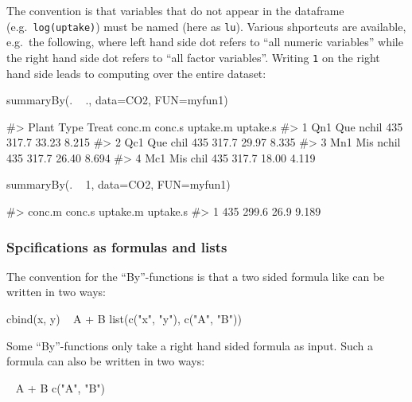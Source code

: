 The convention is that variables that do not appear in the dataframe
(e.g.~\texttt{log(uptake)}) must be named (here as \texttt{lu}). Various
shportcuts are available, e.g.~the following, where left hand side dot
refers to ``all numeric variables'' while the right hand side dot refers
to ``all factor variables''. Writing \texttt{1} on the right hand side
leads to computing over the entire dataset:

\begin{Schunk}
\begin{Sinput}
summaryBy(. ~ ., data=CO2, FUN=myfun1)
\end{Sinput}
\begin{Soutput}
#>   Plant Type Treat conc.m conc.s uptake.m uptake.s
#> 1   Qn1  Que nchil    435  317.7    33.23    8.215
#> 2   Qc1  Que  chil    435  317.7    29.97    8.335
#> 3   Mn1  Mis nchil    435  317.7    26.40    8.694
#> 4   Mc1  Mis  chil    435  317.7    18.00    4.119
\end{Soutput}
\begin{Sinput}
summaryBy(. ~ 1, data=CO2, FUN=myfun1)
\end{Sinput}
\begin{Soutput}
#>   conc.m conc.s uptake.m uptake.s
#> 1    435  299.6     26.9    9.189
\end{Soutput}
\end{Schunk}

\hypertarget{spcifications-as-formulas-and-lists}{%
\subsubsection{Spcifications as formulas and
lists}\label{spcifications-as-formulas-and-lists}}

The convention for the ``By''-functions is that a two sided formula like
can be written in two ways:

\begin{Schunk}
\begin{Sinput}
cbind(x, y) ~ A + B
list(c("x", "y"), c("A", "B"))
\end{Sinput}
\end{Schunk}

Some ``By''-functions only take a right hand sided formula as input.
Such a formula can also be written in two ways:

\begin{Schunk}
\begin{Sinput}
~ A + B
c("A", "B")
\end{Sinput}
\end{Schunk}


